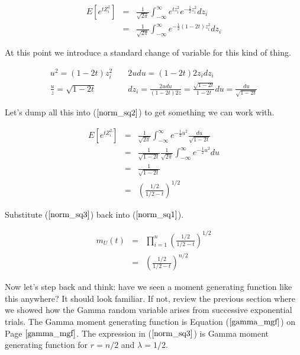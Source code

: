 \documentclass[]{article}
\begin{document}
\begin{eqnarray}
E \left[ e^{t Z_i^2} \right] &= & \frac{1}{\sqrt{2\pi}}
     \int_{-\infty}^{\infty} e^{tz_i^2} e^{-\frac{1}{2} z_i^2}
     dz_i \nonumber \\
  &= & \frac{1}{\sqrt{2\pi}}
     \int_{-\infty}^{\infty} e^{-\frac{1}{2} (1-2t)z_i^2}
      dz_i \label{norm_sq2}
\end{eqnarray}

At this point we introduce a standard change of variable for
this kind of thing.

\begin{eqnarray*}
u^2 = (1-2t)z_i^2 & \; &2udu = (1-2t)2z_idz_i \\
\frac{u}{z} = \sqrt{1-2t} & \; &dz_i = \frac{2udu}{(1-2t)2z}
    = \frac{\sqrt{1-2t}}{1-2t} du = \frac{du}{\sqrt{1-2t}}
\end{eqnarray*}

Let's dump all this into ($\ref{norm_sq2}$) to get something
we can work with.

\begin{eqnarray}
E \left[ e^{t Z_i^2} \right] &= & \frac{1}{\sqrt{2\pi}}
     \int_{-\infty}^{\infty} e^{-\frac{1}{2} u^2}
      \frac{du}{\sqrt{1-2t}} \nonumber \\
  &= & \frac{1}{\sqrt{1-2t}} \frac{1}{\sqrt{2\pi}}
     \int_{-\infty}^{\infty} e^{-\frac{1}{2} u^2} du \nonumber \\
  &= & \frac{1}{\sqrt{1-2t}}  \nonumber  \\
  &= & \left( \frac{1/2}{1/2 - t} \right)^{1/2} \label{norm_sq3}
\end{eqnarray}

Substitute ($\ref{norm_sq3}$) back into ($\ref{norm_sq1}$).

\begin{eqnarray}
m_U(t) &= &\prod_{i=1}^n \left( \frac{1/2}{1/2 - t} \right)^{1/2}
   \nonumber \\
   &= & \left( \frac{1/2}{1/2 - t} \right)^{n/2}
\end{eqnarray}

Now let's step back and think: have we seen a moment generating
function like this anywhere?  It should look familiar.
If not, review the previous section where we showed how the
Gamma random variable arises from successive exponential trials.
The Gamma moment generating function is 
Equation ($\ref{gamma_mgf}$) on Page $\pageref{gamma_mgf}$.
The expression in ($\ref{norm_sq3}$) is Gamma moment generating
function for $r = n/2$ and $\lambda = 1/2$.
\end{document}

